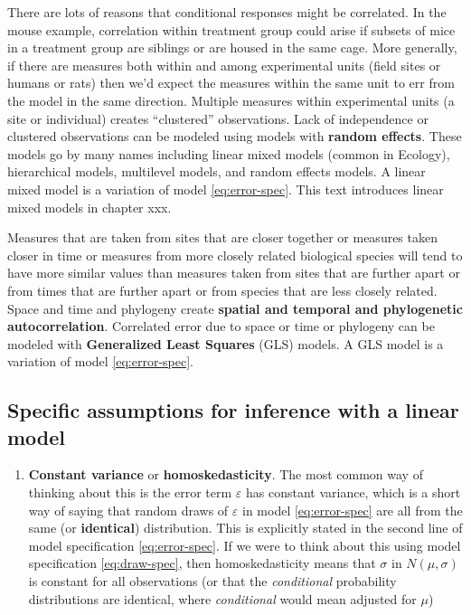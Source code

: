 \documentclass[]{book}
\providecommand{\tightlist}{%
  \setlength{\itemsep}{0pt}\setlength{\parskip}{0pt}}
\begin{document}
There are lots of reasons that conditional responses might be correlated. In the mouse example, correlation within treatment group could arise if subsets of mice in a treatment group are siblings or are housed in the same cage. More generally, if there are measures both within and among experimental units (field sites or humans or rats) then we'd expect the measures within the same unit to err from the model in the same direction. Multiple measures within experimental units (a site or individual) creates ``clustered'' observations. Lack of independence or clustered observations can be modeled using models with \textbf{random effects}. These models go by many names including linear mixed models (common in Ecology), hierarchical models, multilevel models, and random effects models. A linear mixed model is a variation of model \eqref{eq:error-spec}. This text introduces linear mixed models in chapter xxx.

Measures that are taken from sites that are closer together or measures taken closer in time or measures from more closely related biological species will tend to have more similar values than measures taken from sites that are further apart or from times that are further apart or from species that are less closely related. Space and time and phylogeny create \textbf{spatial and temporal and phylogenetic autocorrelation}. Correlated error due to space or time or phylogeny can be modeled with \textbf{Generalized Least Squares} (GLS) models. A GLS model is a variation of model \eqref{eq:error-spec}.

\hypertarget{specific-assumptions-for-inference-with-a-linear-model}{%
\subsection{Specific assumptions for inference with a linear model}\label{specific-assumptions-for-inference-with-a-linear-model}}

\begin{enumerate}
\def\labelenumi{\arabic{enumi}.}
\tightlist
\item
  \textbf{Constant variance} or \textbf{homoskedasticity}. The most common way of thinking about this is the error term \(\varepsilon\) has constant variance, which is a short way of saying that random draws of \(\varepsilon\) in model \eqref{eq:error-spec} are all from the same (or \textbf{identical}) distribution. This is explicitly stated in the second line of model specification \eqref{eq:error-spec}. If we were to think about this using model specification \eqref{eq:draw-spec}, then homoskedasticity means that \(\sigma\) in \(N(\mu, \sigma)\) is constant for all observations (or that the \emph{conditional} probability distributions are identical, where \emph{conditional} would mean adjusted for \(\mu\))
\end{enumerate}
\end{document}
